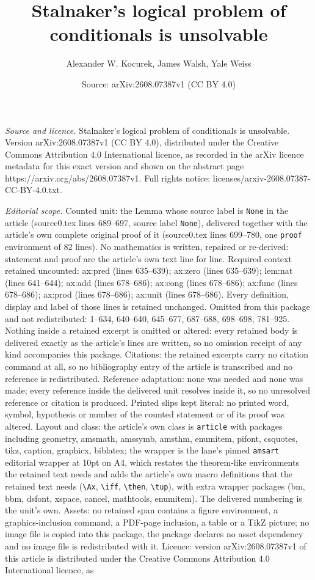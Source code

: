 \documentclass[10pt,a4paper]{amsart}
\title[Stalnaker's logical problem of conditionals is unsolvable]{Stalnaker's logical problem of conditionals is unsolvable}
\author{Alexander W. Kocurek, James Walsh, Yale Weiss}
\date{Source: arXiv:2608.07387v1 (CC BY 4.0)}
\begin{document}
\maketitle

\noindent\emph{Source and licence.} Stalnaker's logical problem of conditionals is unsolvable. Version arXiv:2608.07387v1 (CC BY 4.0), distributed under the Creative Commons Attribution 4.0 International licence, as recorded in the arXiv licence metadata for this exact version and shown on the abstract page https://arxiv.org/abs/2608.07387v1. Full rights notice: licenses/arxiv-2608.07387-CC-BY-4.0.txt.\par\smallskip

\noindent\textit{Editorial scope.} Counted unit: the Lemma whose source label is \texttt{None} in the article (source0.tex lines 689--697, source label \texttt{None}), delivered together with the article's own complete original proof of it (source0.tex lines 699--780, one \texttt{proof} environment of 82 lines). No mathematics is written, repaired or re-derived: statement and proof are the article's own text line for line. Required context retained uncounted: ax:pred (lines 635--639); ax:zero (lines 635--639); lem:nat (lines 641--644); ax:add (lines 678--686); ax:cong (lines 678--686); ax:func (lines 678--686); ax:prod (lines 678--686); ax:unit (lines 678--686). Every definition, display and label of those lines is retained unchanged. Omitted from this package and not redistributed: 1--634, 640--640, 645--677, 687--688, 698--698, 781--925. Nothing inside a retained excerpt is omitted or altered: every retained body is delivered exactly as the article's lines are written, so no omission receipt of any kind accompanies this package. Citations: the retained excerpts carry no citation command at all, so no bibliography entry of the article is transcribed and no reference is redistributed. Reference adaptation: none was needed and none was made; every reference inside the delivered unit resolves inside it, so no unresolved reference or citation is produced. Printed slips kept literal: no printed word, symbol, hypothesis or number of the counted statement or of its proof was altered. Layout and class: the article's own class is \texttt{article} with packages including geometry, amsmath, amssymb, amsthm, enumitem, pifont, csquotes, tikz, caption, graphicx, biblatex; the wrapper is the lane's pinned \texttt{amsart} editorial wrapper at 10pt on A4, which restates the theorem-like environments the retained text needs and adds the article's own macro definitions that the retained text needs (\texttt{\textbackslash Ax}, \texttt{\textbackslash iff}, \texttt{\textbackslash then}, \texttt{\textbackslash tup}), with extra wrapper packages (bm, bbm, dsfont, xspace, cancel, mathtools, enumitem). The delivered numbering is the unit's own. Assets: no retained span contains a figure environment, a graphics-inclusion command, a PDF-page inclusion, a table or a TikZ picture; no image file is copied into this package, the package declares no asset dependency and no image file is redistributed with it. Licence: version arXiv:2608.07387v1 of this article is distributed under the Creative Commons Attribution 4.0 International licence, as 
\end{document}
